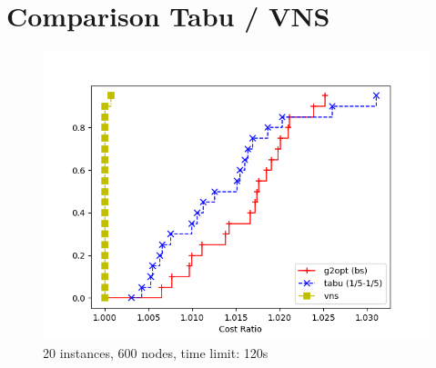 \section{Comparison Tabu / VNS}

\begin{figure}[h]
    \centering
    \includegraphics*[width=.6\textwidth]{../plots/perfprof_met_costs_result.png}
    \caption*{20 instances, 600 nodes, time limit: 120s}
\end{figure}